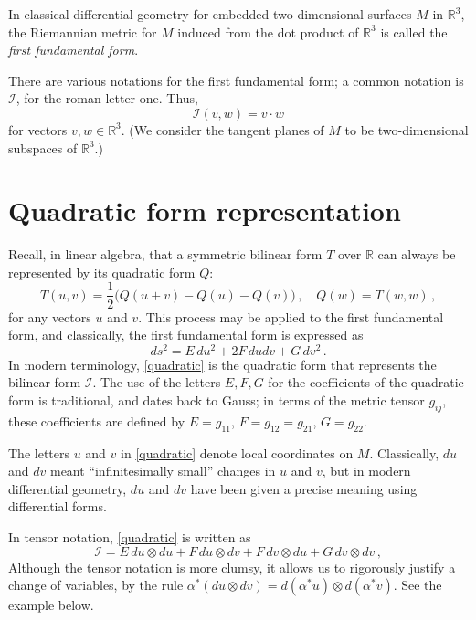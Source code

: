 \documentclass[12pt]{article}
\newcommand{\real}{\mathbb{R}}
\providecommand{\defnterm}[1]{\emph{#1}}
\begin{document}
In classical differential geometry for embedded two-dimensional surfaces $M$ in $\real^3$,
the Riemannian metric for $M$ induced from the dot product of $\real^3$
is called the \defnterm{first fundamental form}.

There are various notations for the first fundamental form;
a common notation is $\mathcal{I}$,
for the roman letter one.  Thus,
\begin{equation}\label{simple}
\mathcal{I}(v, w) = v \cdot w
\end{equation}
for vectors $v, w \in \real^3$.  (We consider the tangent planes of $M$
to be two-dimensional subspaces of $\real^3$.)

\section*{Quadratic form representation}
Recall, in linear algebra,
that a symmetric bilinear form $T$ over $\real$
can always be represented by its quadratic form $Q$:
\[
T(u, v) = \frac{1}{2} \bigl( Q(u+v) - Q(u) - Q(v) \bigr)\,, \quad Q(w) = T(w,w)\,,
\]
for any vectors $u$ and $v$.
This process may be applied to the first fundamental form, 
and classically, the first fundamental form is  expressed as
\begin{equation}\label{quadratic}
ds^2 = E \, du^2 + 2F \, du dv + G \, dv^2\,.
\end{equation}
In modern terminology, \eqref{quadratic} is the quadratic form that 
represents the bilinear form $\mathcal{I}$.
The use of the letters $E, F, G$ for the coefficients of the quadratic form
is traditional, and dates back to Gauss;
in terms of the metric tensor $g_{ij}$, these coefficients
are defined by $E = g_{11}$, $F = g_{12} = g_{21}$, $G = g_{22}$.

The letters $u$ and $v$ in \eqref{quadratic} denote local coordinates on $M$.
Classically, $du$ and $dv$ meant ``infinitesimally small'' changes in $u$ and $v$,
but in modern differential geometry, $du$ and $dv$ have been given a precise
meaning using differential forms.

In tensor notation, \eqref{quadratic} is written as
\begin{equation}\label{tensor}
\mathcal{I} = E \, du \otimes du + F \, du \otimes dv + F \, dv \otimes du + G \, dv \otimes dv\,,
\end{equation}
Although the tensor notation is more clumsy,
it allows us to rigorously justify a change of variables, by the rule
$\alpha^* (du \otimes dv) = d(\alpha^*u) \otimes d(\alpha^*v)$.
See the example below.
\end{document}
